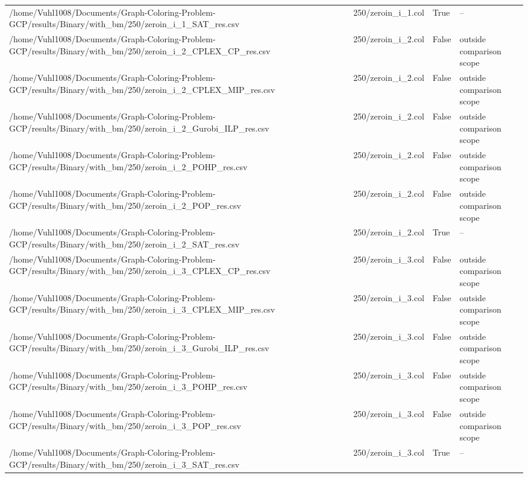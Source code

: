 \begin{table}[htbp]
\begin{tabular}{llll}
/home/Vuhl1008/Documents/Graph-Coloring-Problem-GCP/results/Binary/with\_bm/250/zeroin\_i\_1\_SAT\_res.csv & 250/zeroin\_i\_1.col & True & -- \\
/home/Vuhl1008/Documents/Graph-Coloring-Problem-GCP/results/Binary/with\_bm/250/zeroin\_i\_2\_CPLEX\_CP\_res.csv & 250/zeroin\_i\_2.col & False & outside comparison scope \\
/home/Vuhl1008/Documents/Graph-Coloring-Problem-GCP/results/Binary/with\_bm/250/zeroin\_i\_2\_CPLEX\_MIP\_res.csv & 250/zeroin\_i\_2.col & False & outside comparison scope \\
/home/Vuhl1008/Documents/Graph-Coloring-Problem-GCP/results/Binary/with\_bm/250/zeroin\_i\_2\_Gurobi\_ILP\_res.csv & 250/zeroin\_i\_2.col & False & outside comparison scope \\
/home/Vuhl1008/Documents/Graph-Coloring-Problem-GCP/results/Binary/with\_bm/250/zeroin\_i\_2\_POHP\_res.csv & 250/zeroin\_i\_2.col & False & outside comparison scope \\
/home/Vuhl1008/Documents/Graph-Coloring-Problem-GCP/results/Binary/with\_bm/250/zeroin\_i\_2\_POP\_res.csv & 250/zeroin\_i\_2.col & False & outside comparison scope \\
/home/Vuhl1008/Documents/Graph-Coloring-Problem-GCP/results/Binary/with\_bm/250/zeroin\_i\_2\_SAT\_res.csv & 250/zeroin\_i\_2.col & True & -- \\
/home/Vuhl1008/Documents/Graph-Coloring-Problem-GCP/results/Binary/with\_bm/250/zeroin\_i\_3\_CPLEX\_CP\_res.csv & 250/zeroin\_i\_3.col & False & outside comparison scope \\
/home/Vuhl1008/Documents/Graph-Coloring-Problem-GCP/results/Binary/with\_bm/250/zeroin\_i\_3\_CPLEX\_MIP\_res.csv & 250/zeroin\_i\_3.col & False & outside comparison scope \\
/home/Vuhl1008/Documents/Graph-Coloring-Problem-GCP/results/Binary/with\_bm/250/zeroin\_i\_3\_Gurobi\_ILP\_res.csv & 250/zeroin\_i\_3.col & False & outside comparison scope \\
/home/Vuhl1008/Documents/Graph-Coloring-Problem-GCP/results/Binary/with\_bm/250/zeroin\_i\_3\_POHP\_res.csv & 250/zeroin\_i\_3.col & False & outside comparison scope \\
/home/Vuhl1008/Documents/Graph-Coloring-Problem-GCP/results/Binary/with\_bm/250/zeroin\_i\_3\_POP\_res.csv & 250/zeroin\_i\_3.col & False & outside comparison scope \\
/home/Vuhl1008/Documents/Graph-Coloring-Problem-GCP/results/Binary/with\_bm/250/zeroin\_i\_3\_SAT\_res.csv & 250/zeroin\_i\_3.col & True & -- \\

\end{tabular}
\end{table}

